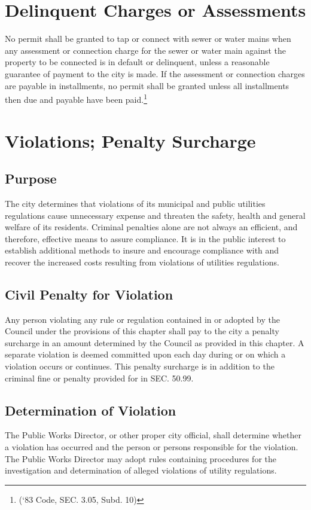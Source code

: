 \section{Delinquent Charges or Assessments}
No permit shall be granted to tap or connect with sewer or water mains when any assessment or connection charge for the sewer or water main against the property to be connected is in default or delinquent, unless a reasonable guarantee of payment to the city is made.  If the assessment or connection charges are payable in installments, no permit shall be granted unless all installments then due and payable have been paid.\footnote{(‘83 Code, SEC. 3.05, Subd. 10)}

\setcounter{section}{97}
\section{Violations; Penalty Surcharge}
\subsection{Purpose}
The city determines that violations of its municipal and public utilities regulations cause unnecessary expense and threaten the safety, health and general welfare of its residents.  Criminal penalties alone are not always an efficient, and therefore, effective means to assure compliance.  It is in the public interest to establish additional methods to insure and encourage compliance with and recover the increased costs resulting from violations of utilities regulations.
\subsection{Civil Penalty for Violation}
Any person violating any rule or regulation contained in or adopted by the Council under the provisions of this chapter shall pay to the city a penalty surcharge in an amount determined by the Council as provided in this chapter.  A separate violation is deemed committed upon each day during or on which a violation occurs or continues.  This penalty surcharge is in addition to the criminal fine or penalty provided for in SEC. 50.99.
\subsection{Determination of Violation}
The Public Works Director, or other proper city official, shall determine whether a violation has occurred and the person or persons responsible for the violation.  The Public Works Director may adopt rules containing procedures for the investigation and determination of alleged violations of utility regulations.
